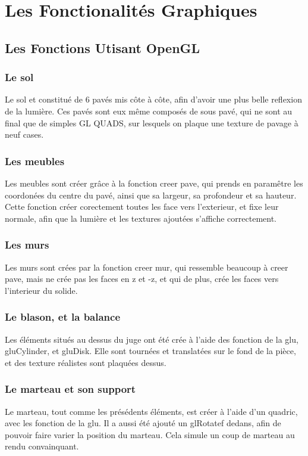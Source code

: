 \section{Les Fonctionalités Graphiques}

\subsection{Les Fonctions Utisant OpenGL}
	\subsubsection{Le sol}
	Le sol et constitué de 6 pavés mis côte à côte, afin d'avoir une plus belle reflexion de la lumière. Ces pavés sont eux même composés de sous pavé, qui ne sont au final que de simples GL QUADS, sur lesquels on plaque une texture de pavage à neuf cases.
	
	\subsubsection{Les meubles}
	Les meubles sont créer grâce à la fonction creer pave, qui prends en paramêtre les coordonées du centre du pavé, ainsi que sa largeur, sa profondeur et sa hauteur. Cette fonction créer corectement toutes les face vers l'exterieur, et fixe leur normale, afin que la lumière et les textures ajoutées s'affiche correctement.
	\subsubsection{Les murs}
	Les murs sont crées par la fonction creer mur, qui ressemble beaucoup à creer pave, mais ne crée pas les faces en z et -z, et qui de plus, crée les faces vers l'interieur du solide.
	\subsubsection{Le blason, et la balance}
	Les éléments situés au dessus du juge ont été crée à l'aide des fonction de la glu, gluCylinder, et gluDisk. Elle sont tournées et translatées sur le fond de la pièce, et des texture réalistes sont plaquées dessus.
	\subsubsection{Le marteau et son support}
	Le marteau, tout comme les présédents éléments, est créer à l'aide d'un quadric, avec les fonction de la glu. Il a aussi été ajouté un glRotatef dedans, afin de pouvoir faire varier la position du marteau. Cela simule un coup de marteau au rendu convainquant.
